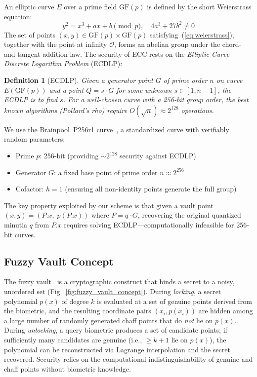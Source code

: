 \documentclass[conference]{IEEEtran}
\newtheorem{definition}{Definition}
\newcommand{\GFp}{\mathrm{GF}(p)}
\begin{document}
An elliptic curve $E$ over a prime field $\GFp{}$ is defined by the short Weierstrass equation:
\begin{equation}
    y^2 = x^3 + ax + b \pmod{p}, \quad 4a^3 + 27b^2 \neq 0
    \label{eq:weierstrass}
\end{equation}
The set of points $(x, y) \in \GFp{} \times \GFp{}$ satisfying~(\ref{eq:weierstrass}), together with the point at infinity $\mathcal{O}$, forms an abelian group under the chord-and-tangent addition law. The security of ECC rests on the \emph{Elliptic Curve Discrete Logarithm Problem} (ECDLP):

\begin{definition}[ECDLP]
Given a generator point $G$ of prime order $n$ on curve $E(\GFp{})$ and a point $Q = s \cdot G$ for some unknown $s \in [1, n{-}1]$, the ECDLP is to find $s$. For a well-chosen curve with a 256-bit group order, the best known algorithms (Pollard's rho) require $O(\sqrt{n}) \approx 2^{128}$ operations.
\end{definition}

We use the Brainpool~P256r1 curve~\cite{rfc5639}, a standardized curve with verifiably random parameters:
\begin{itemize}
    \item Prime $p$: 256-bit (providing $\sim\!2^{128}$ security against ECDLP)
    \item Generator $G$: a fixed base point of prime order $n \approx 2^{256}$
    \item Cofactor: $h = 1$ (ensuring all non-identity points generate the full group)
\end{itemize}

\noindent The key property exploited by our scheme is that given a vault point $(x, y) = (P.x, \; p(P.x))$ where $P = q \cdot G$, recovering the original quantized minutia $q$ from $P.x$ requires solving ECDLP---computationally infeasible for 256-bit curves.

\subsection{Fuzzy Vault Concept}
\label{sec:fuzzy_vault_concept}

The fuzzy vault~\cite{juels2002fuzzy} is a cryptographic construct that binds a secret to a noisy, unordered set (Fig.~\ref{fig:fuzzy_vault_concept}). During \emph{locking}, a secret polynomial $p(x)$ of degree $k$ is evaluated at a set of genuine points derived from the biometric, and the resulting coordinate pairs $(x_i, p(x_i))$ are hidden among a large number of randomly generated chaff points that do \emph{not} lie on $p(x)$. During \emph{unlocking}, a query biometric produces a set of candidate points; if sufficiently many candidates are genuine (i.e., $\geq k+1$ lie on $p(x)$), the polynomial can be reconstructed via Lagrange interpolation and the secret recovered. Security relies on the computational indistinguishability of genuine and chaff points without biometric knowledge.
\end{document}
